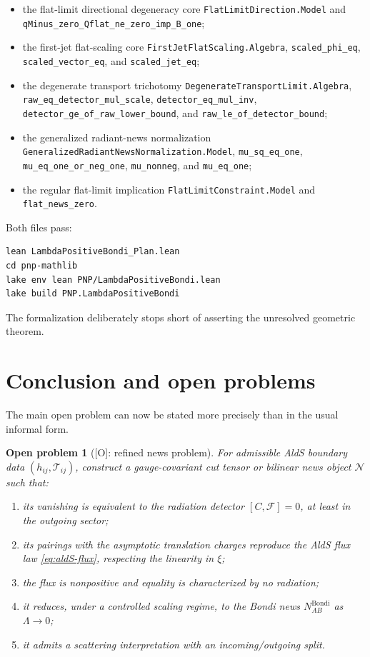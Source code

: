\documentclass[11pt,a4paper]{article}
\newtheorem{problem}[theorem]{Open problem}
\newcommand{\cT}{\mathcal{T}}
\newcommand{\cF}{\mathcal{F}}
\newcommand{\statusO}{\textsf{[O]}}
\begin{document}
\begin{itemize}
\texttt{GeneralizedTransportFlatBalance.Model}, \texttt{tensor\_normalization\_gauge\_free}, \texttt{vector\_normalization\_gauge\_free};
  \item the flat-limit directional degeneracy core \texttt{FlatLimitDirection.Model} and \texttt{qMinus\_zero\_Qflat\_ne\_zero\_imp\_B\_one};
  \item the first-jet flat-scaling core \texttt{FirstJetFlatScaling.Algebra}, \texttt{scaled\_phi\_eq}, \texttt{scaled\_vector\_eq}, and \texttt{scaled\_jet\_eq};
  \item the degenerate transport trichotomy \texttt{DegenerateTransportLimit.Algebra}, \texttt{raw\_eq\_detector\_mul\_scale}, \texttt{detector\_eq\_mul\_inv}, \texttt{detector\_ge\_of\_raw\_lower\_bound}, and \texttt{raw\_le\_of\_detector\_bound};
  \item the generalized radiant-news normalization \texttt{GeneralizedRadiantNewsNormalization.Model}, \texttt{mu\_sq\_eq\_one}, \texttt{mu\_eq\_one\_or\_neg\_one}, \texttt{mu\_nonneg}, and \texttt{mu\_eq\_one};
  \item the regular flat-limit implication \texttt{FlatLimitConstraint.Model} and \texttt{flat\_news\_zero}.
\end{itemize}

Both files pass:
\begin{verbatim}
lean LambdaPositiveBondi_Plan.lean
cd pnp-mathlib
lake env lean PNP/LambdaPositiveBondi.lean
lake build PNP.LambdaPositiveBondi
\end{verbatim}

The formalization deliberately stops short of asserting the unresolved geometric theorem.

\section{Conclusion and open problems}

The main open problem can now be stated more precisely than in the usual informal form.

\begin{problem}[\statusO: refined news problem]
For admissible AldS boundary data \((h_{ij},\cT_{ij})\), construct a gauge-covariant cut tensor or bilinear news object \(\mathcal N\) such that:
\begin{enumerate}
  \item its vanishing is equivalent to the radiation detector \([C,\cF]=0\), at least in the outgoing sector;
  \item its pairings with the asymptotic translation charges reproduce the AldS flux law \eqref{eq:aldS-flux}, respecting the linearity in \(\xi\);
  \item the flux is nonpositive and equality is characterized by no radiation;
  \item it reduces, under a controlled scaling regime, to the Bondi news \(N^{\mathrm{Bondi}}_{AB}\) as \(\Lambda\to0\);
  \item it admits a scattering interpretation with an incoming/outgoing split.
\end{enumerate}
\end{problem}
\end{document}
